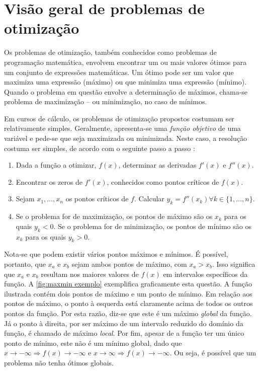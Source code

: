 \section{Visão geral de problemas de otimização}

Os problemas de otimização, também conhecidos como problemas de programação matemática, envolvem encontrar um ou mais valores ótimos para um conjunto de expressões matemáticas. Um ótimo pode ser um valor que maximiza uma expressão (máximo) ou que minimiza uma expressão (mínimo). Quando o problema em questão envolve a determinação de máximos, chama-se problema de maximização -- ou minimização, no caso de mínimos.

Em cursos de cálculo, os problemas de otimização propostos costumam ser relativamente simples. Geralmente, apresenta-se uma \emph{função objetivo} de uma variável e pede-se que seja maximizada ou minimizada. Neste caso, a resolução costuma ser simples, de acordo com o seguinte passo a passo \cite{STEWART2016}:

\begin{enumerate}
    \item Dada a função a otimizar, $f(x)$, determinar as derivadas $f'(x)$ e $f''(x)$.
    \item Encontrar os zeros de $f'(x)$, conhecidos como pontos críticos de $f(x)$.
    \item Sejam $x_1,\dots,x_n$ os pontos críticos de $f$. Calcular $y_k = f''(x_k) \forall k \in \{1,\dots,n\}$.
    \item Se o problema for de maximização, os pontos de máximo são os $x_k$ para os quais $y_k < 0$. Se o problema for de minimização, os pontos de mínimo são os $x_k$ para os quais $y_k > 0$.
\end{enumerate}

Nota-se que podem existir vários pontos máximos e mínimos. É possível, portanto, que $x_a$ e $x_b$ sejam ambos pontos de máximo, com $x_a > x_b$. Isso significa que $x_a$ e $x_b$ resultam nos maiores valores de $f(x)$ em intervalos específicos da função. A \cref{fig:maxmin exemplo} exemplifica graficamente esta questão. A função ilustrada contém dois pontos de máximo e um ponto de mínimo. Em relação aos pontos de máximo, o ponto à esquerda está claramente acima de todos os outros pontos da função. Por esta razão, diz-se que este é um máximo \emph{global} da função. Já o ponto à direita, por ser máximo de um intervalo reduzido do domínio da função, é chamado de máximo \emph{local}. Por fim, apesar de a função ter um único ponto de mínimo, este não é um mínimo global, dado que $x \to -\infty \Rightarrow f(x) \to -\infty$ e $x \to \infty \Rightarrow f(x) \to -\infty$. Ou seja, é possível que um problema não tenha ótimos globais.

